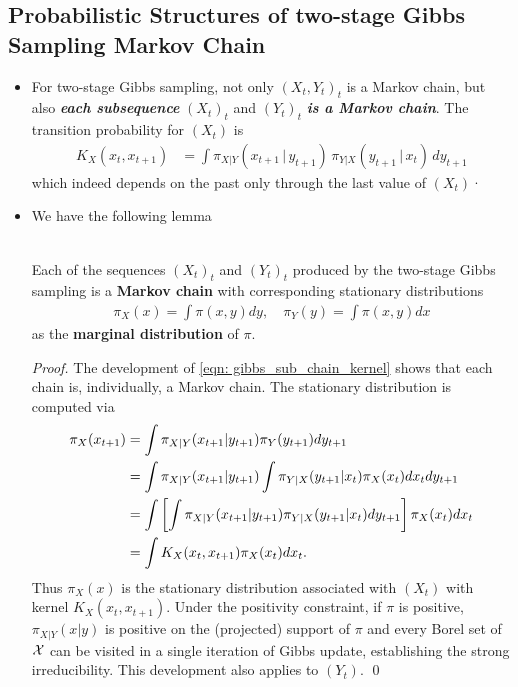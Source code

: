 \documentclass[11pt]{article}
\begin{document}
\subsection{Probabilistic Structures of two-stage Gibbs Sampling Markov Chain}
\begin{itemize}
\item For two-stage Gibbs sampling, not only $(X_t, Y_t)_t$ is a Markov chain, but also \emph{\textbf{each subsequence}} $(X_t)_t$ and $(Y_t)_t$ \emph{\textbf{is a Markov chain}}. The transition probability for $(X_t)$ is 
\begin{align}
K_{X}(x_{t}, x_{t+1}) &= \int \pi_{X|Y}(x_{t+1}\,|\, y_{t+1})\,\pi_{Y|X}(y_{t+1}\,|\,x_{t})\, dy_{t+1}  \label{eqn: gibbs_sub_chain_kernel}
\end{align} which indeed depends on the past only through the last value of $(X_t)$· 

\item We have the following lemma
\begin{lemma}\citep{robert1999monte}\\
Each of the sequences $(X_t)_t$ and $(Y_t)_t$ produced by the two-stage Gibbs sampling is a \textbf{Markov chain} with corresponding stationary distributions
\begin{align}
\pi_{X}(x) = \int \pi(x, y) dy, \quad  \pi_{Y}(y) = \int \pi(x, y) dx  \label{eqn: gibbs_sub_chain_stationary}
\end{align} as the \textbf{marginal distribution} of $\pi$.
\end{lemma}
\begin{proof}
The development of \eqref{eqn: gibbs_sub_chain_kernel} shows that each chain is, individually, a Markov chain. The stationary distribution is computed via
\begin{align*}
\pi_{X}(x_{t+1}) &= \int \pi_{X|Y}(x_{t+1}|y_{t+1}) \pi_{Y}(y_{t+1}) dy_{t+1}\\
&= \int \pi_{X|Y}(x_{t+1}|y_{t+1}) \int \pi_{Y|X}(y_{t+1}|x_{t}) \pi_{X}(x_{t}) dx_{t} dy_{t+1}\\
&= \int \left[\int \pi_{X|Y}(x_{t+1}|y_{t+1})\pi_{Y|X}(y_{t+1}|x_{t}) dy_{t+1}\right]\pi_{X}(x_{t}) dx_{t} \\
&= \int K_{X}(x_{t}, x_{t+1}) \pi_{X}(x_{t}) dx_{t}.
\end{align*} Thus $\pi_{X}(x)$ is the stationary distribution associated with $(X_t)$ with kernel $K_{X}(x_{t}, x_{t+1})$.
Under the positivity constraint, if $\pi$ is positive, $\pi_{X|Y}(x|y)$ is positive on the (projected) support of $\pi$ and every Borel set of ${\mathcal X}$ can be visited in a single iteration of Gibbs update, establishing the strong irreducibility. This development also applies to $(Y_t)$. \qed
\end{proof}


\end{itemize}
\end{document}
